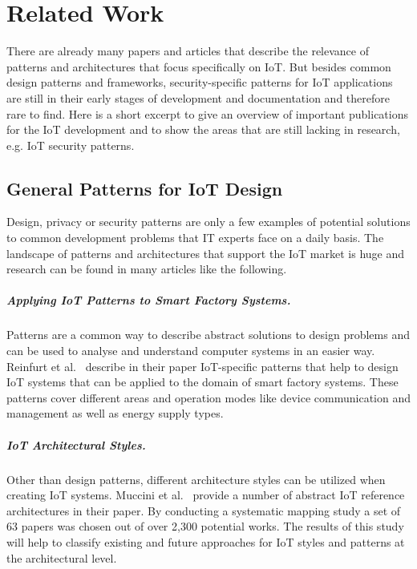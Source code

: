 
\chapter{Related Work}\label{ch:related_work}
There are already many papers and articles that describe the relevance of patterns and architectures that focus specifically on IoT. But besides common design patterns and frameworks, security-specific patterns for IoT applications are still in their early stages of development and documentation and therefore rare to find. Here is a short excerpt to give an overview of important publications for the IoT development and to show the areas that are still lacking in research, e.g. IoT security patterns.


\section{General Patterns for IoT Design}
Design, privacy or security patterns are only a few examples of potential solutions to common development problems that IT experts face on a daily basis. The landscape of patterns and architectures that support the IoT market is huge and research can be found in many articles like the following.

\paragraph{Applying IoT Patterns to Smart Factory Systems.} Patterns are a common way to describe abstract solutions to design problems and can be used to analyse and understand computer systems in an easier way. Reinfurt et al.~\cite{Reinfurt2017} describe in their paper IoT-specific patterns that help to design IoT systems that can be applied to the domain of smart factory systems. These patterns cover different areas and operation modes like device communication and management as well as energy supply types.

\paragraph{IoT Architectural Styles.} Other than design patterns, different architecture styles can be utilized when creating IoT systems. Muccini et al.~\cite{Muccini2018} provide a number of abstract IoT reference architectures in their paper. By conducting a systematic mapping study a set of 63 papers was chosen out of over 2,300 potential works. The results of this study will help to classify existing and future approaches for IoT styles and patterns at the architectural level.

